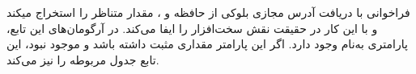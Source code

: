 فراخوانی
با دریافت آدرس مجازی بلوکی از حافظه و
،
مقدار
متناظر را استخراج میکند و با این کار در حقیقت نقش سخت‌افزار
را ایفا می‌کند. در آرگومان‌های این تابع، پارامتری به‌نام
وجود دارد. اگر این پارامتر مقداری مثبت داشته باشد و
موجود نبود، این تابع جدول مربوطه‌ را نیز
می‌کند.